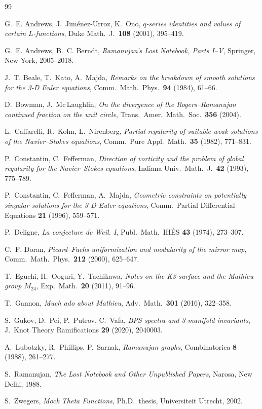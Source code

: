 \documentclass[11pt,a4paper]{article}
\theoremstyle{plain}
\theoremstyle{definition}
\theoremstyle{remark}
\begin{document}
\begin{thebibliography}{99}\small

G.~E. Andrews, J.~Jim\'enez-Urroz, K.~Ono,
\emph{$q$-series identities and values of certain $L$-functions},
Duke Math.\ J.\ \textbf{108} (2001), 395--419.

G.~E. Andrews, B.~C. Berndt,
\emph{Ramanujan's Lost Notebook, Parts I--V},
Springer, New York, 2005--2018.

J.~T. Beale, T.~Kato, A.~Majda,
\emph{Remarks on the breakdown of smooth solutions for the 3-D Euler
equations}, Comm.\ Math.\ Phys.\ \textbf{94} (1984), 61--66.

D.~Bowman, J.~Mc\,Laughlin,
\emph{On the divergence of the Rogers--Ramanujan continued fraction on the
unit circle}, Trans.\ Amer.\ Math.\ Soc.\ \textbf{356} (2004).

L.~Caffarelli, R.~Kohn, L.~Nirenberg,
\emph{Partial regularity of suitable weak solutions of the Navier--Stokes
equations}, Comm.\ Pure Appl.\ Math.\ \textbf{35} (1982), 771--831.

P.~Constantin, C.~Fefferman,
\emph{Direction of vorticity and the problem of global regularity for the
Navier--Stokes equations}, Indiana Univ.\ Math.\ J.\ \textbf{42} (1993),
775--789.

P.~Constantin, C.~Fefferman, A.~Majda,
\emph{Geometric constraints on potentially singular solutions for the 3-D
Euler equations}, Comm.\ Partial Differential Equations \textbf{21} (1996),
559--571.

P.~Deligne,
\emph{La conjecture de Weil. I},
Publ.\ Math.\ IH\'ES \textbf{43} (1974), 273--307.

C.~F. Doran,
\emph{Picard--Fuchs uniformization and modularity of the mirror map},
Comm.\ Math.\ Phys.\ \textbf{212} (2000), 625--647.

T.~Eguchi, H.~Ooguri, Y.~Tachikawa,
\emph{Notes on the K3 surface and the Mathieu group $M_{24}$},
Exp.\ Math.\ \textbf{20} (2011), 91--96.

T.~Gannon,
\emph{Much ado about Mathieu},
Adv.\ Math.\ \textbf{301} (2016), 322--358.

S.~Gukov, D.~Pei, P.~Putrov, C.~Vafa,
\emph{BPS spectra and 3-manifold invariants},
J.\ Knot Theory Ramifications \textbf{29} (2020), 2040003.

A.~Lubotzky, R.~Phillips, P.~Sarnak,
\emph{Ramanujan graphs},
Combinatorica \textbf{8} (1988), 261--277.

S.~Ramanujan,
\emph{The Lost Notebook and Other Unpublished Papers},
Narosa, New Delhi, 1988.

S.~Zwegers,
\emph{Mock Theta Functions},
Ph.D.\ thesis, Universiteit Utrecht, 2002.

\end{thebibliography}
\end{document}
